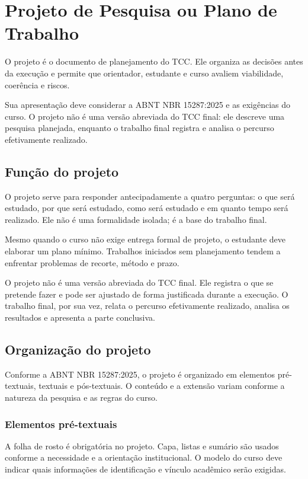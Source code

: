 \chapter{Projeto de Pesquisa ou Plano de Trabalho}

O projeto é o documento de planejamento do TCC. Ele organiza as decisões antes da execução e permite que orientador, estudante e curso avaliem viabilidade, coerência e riscos.

Sua apresentação deve considerar a ABNT NBR 15287:2025 e as exigências do curso. O projeto não é uma versão abreviada do TCC final: ele descreve uma pesquisa planejada, enquanto o trabalho final registra e analisa o percurso efetivamente realizado.

\section{Função do projeto}

O projeto serve para responder antecipadamente a quatro perguntas: o que será estudado, por que será estudado, como será estudado e em quanto tempo será realizado. Ele não é uma formalidade isolada; é a base do trabalho final.

Mesmo quando o curso não exige entrega formal de projeto, o estudante deve elaborar um plano mínimo. Trabalhos iniciados sem planejamento tendem a enfrentar problemas de recorte, método e prazo.

O projeto não é uma versão abreviada do TCC final. Ele registra o que se pretende fazer e pode ser ajustado de forma justificada durante a execução. O trabalho final, por sua vez, relata o percurso efetivamente realizado, analisa os resultados e apresenta a parte conclusiva.

\section{Organização do projeto}

Conforme a ABNT NBR 15287:2025, o projeto é organizado em elementos pré-textuais, textuais e pós-textuais. O conteúdo e a extensão variam conforme a natureza da pesquisa e as regras do curso.

\subsection{Elementos pré-textuais}

A folha de rosto é obrigatória no projeto. Capa, listas e sumário são usados conforme a necessidade e a orientação institucional. O modelo do curso deve indicar quais informações de identificação e vínculo acadêmico serão exigidas.

